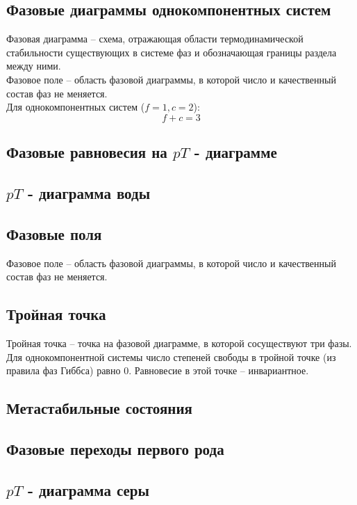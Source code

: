 \documentclass[14pt,a4paper]{scrartcl}
\begin{document}
	\subsection*{Фазовые диаграммы однокомпонентных систем}
	Фазовая диаграмма -- схема, отражающая области термодинамической стабильности существующих в системе фаз и обозначающая границы раздела между ними.\\
	Фазовое поле -- область фазовой диаграммы, в которой число и качественный состав фаз не меняется. \\
	Для однокомпонентных систем ($f = 1, c = 2$):
	$$ f+c = 3 $$
	\subsection*{Фазовые равновесия на $pT$ - диаграмме}
	\subsection*{$pT$ - диаграмма воды}
	\subsection*{Фазовые поля}
	Фазовое поле -- область фазовой диаграммы, в которой число и качественный состав фаз не меняется.
	\subsection*{Тройная точка}
	Тройная точка -- точка на фазовой диаграмме, в которой сосуществуют три фазы. Для однокомпонентной системы число степеней свободы в тройной точке (из правила фаз Гиббса) равно 0. Равновесие в этой точке -- инвариантное.
	\subsection*{Метастабильные состояния}
	\subsection*{Фазовые переходы первого рода}
	\subsection*{$pT$ - диаграмма серы}
	
\end{document}
